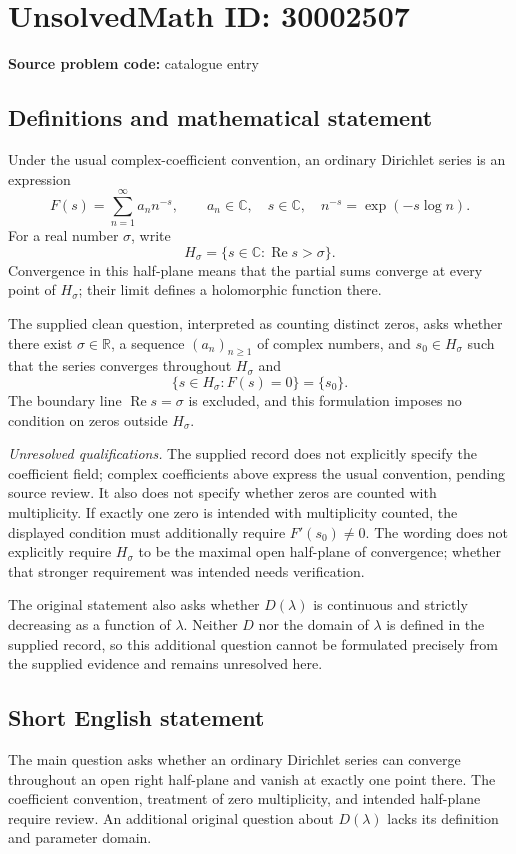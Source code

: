 \documentclass[11pt]{article}
\newcommand{\R}{\mathbb{R}}
\newcommand{\C}{\mathbb{C}}
\begin{document}
\section*{UnsolvedMath ID: 30002507}
\textbf{Source problem code:} catalogue entry
\subsection{Definitions and mathematical statement}
Under the usual complex-coefficient convention, an ordinary Dirichlet series is an expression
\[
F(s)=\sum_{n=1}^{\infty}a_n n^{-s},\qquad a_n\in\C,\quad s\in\C,\quad n^{-s}=\exp(-s\log n).
\]
For a real number \(\sigma\), write
\[
H_\sigma=\{s\in\C:\operatorname{Re}s>\sigma\}.
\]
Convergence in this half-plane means that the partial sums converge at every point of \(H_\sigma\); their limit defines a holomorphic function there.

The supplied clean question, interpreted as counting distinct zeros, asks whether there exist \(\sigma\in\R\), a sequence \((a_n)_{n\geq1}\) of complex numbers, and \(s_0\in H_\sigma\) such that the series converges throughout \(H_\sigma\) and
\[
\{s\in H_\sigma:F(s)=0\}=\{s_0\}.
\]
The boundary line \(\operatorname{Re}s=\sigma\) is excluded, and this formulation imposes no condition on zeros outside \(H_\sigma\).

\textit{Unresolved qualifications.} The supplied record does not explicitly specify the coefficient field; complex coefficients above express the usual convention, pending source review. It also does not specify whether zeros are counted with multiplicity. If exactly one zero is intended with multiplicity counted, the displayed condition must additionally require \(F'(s_0)\ne0\). The wording does not explicitly require \(H_\sigma\) to be the maximal open half-plane of convergence; whether that stronger requirement was intended needs verification.

The original statement also asks whether \(D(\lambda)\) is continuous and strictly decreasing as a function of \(\lambda\). Neither \(D\) nor the domain of \(\lambda\) is defined in the supplied record, so this additional question cannot be formulated precisely from the supplied evidence and remains unresolved here.
\subsection{Short English statement}
The main question asks whether an ordinary Dirichlet series can converge throughout an open right half-plane and vanish at exactly one point there. The coefficient convention, treatment of zero multiplicity, and intended half-plane require review. An additional original question about \(D(\lambda)\) lacks its definition and parameter domain.
\end{document}
